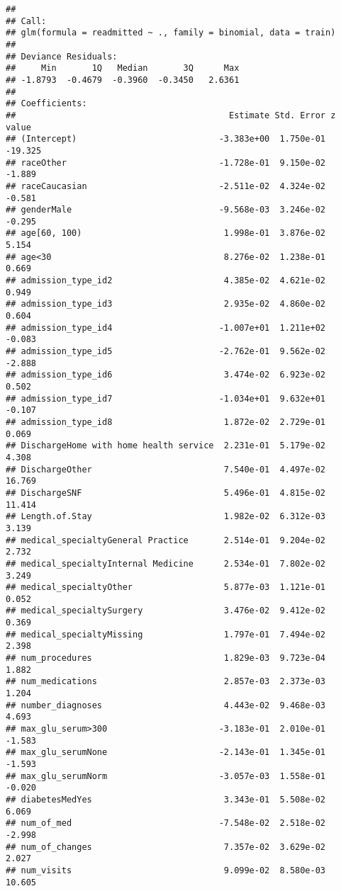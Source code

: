 \documentclass[
]{article}
\begin{document}
\begin{verbatim}
## 
## Call:
## glm(formula = readmitted ~ ., family = binomial, data = train)
## 
## Deviance Residuals: 
##     Min       1Q   Median       3Q      Max  
## -1.8793  -0.4679  -0.3960  -0.3450   2.6361  
## 
## Coefficients:
##                                          Estimate Std. Error z value
## (Intercept)                            -3.383e+00  1.750e-01 -19.325
## raceOther                              -1.728e-01  9.150e-02  -1.889
## raceCaucasian                          -2.511e-02  4.324e-02  -0.581
## genderMale                             -9.568e-03  3.246e-02  -0.295
## age[60, 100)                            1.998e-01  3.876e-02   5.154
## age<30                                  8.276e-02  1.238e-01   0.669
## admission_type_id2                      4.385e-02  4.621e-02   0.949
## admission_type_id3                      2.935e-02  4.860e-02   0.604
## admission_type_id4                     -1.007e+01  1.211e+02  -0.083
## admission_type_id5                     -2.762e-01  9.562e-02  -2.888
## admission_type_id6                      3.474e-02  6.923e-02   0.502
## admission_type_id7                     -1.034e+01  9.632e+01  -0.107
## admission_type_id8                      1.872e-02  2.729e-01   0.069
## DischargeHome with home health service  2.231e-01  5.179e-02   4.308
## DischargeOther                          7.540e-01  4.497e-02  16.769
## DischargeSNF                            5.496e-01  4.815e-02  11.414
## Length.of.Stay                          1.982e-02  6.312e-03   3.139
## medical_specialtyGeneral Practice       2.514e-01  9.204e-02   2.732
## medical_specialtyInternal Medicine      2.534e-01  7.802e-02   3.249
## medical_specialtyOther                  5.877e-03  1.121e-01   0.052
## medical_specialtySurgery                3.476e-02  9.412e-02   0.369
## medical_specialtyMissing                1.797e-01  7.494e-02   2.398
## num_procedures                          1.829e-03  9.723e-04   1.882
## num_medications                         2.857e-03  2.373e-03   1.204
## number_diagnoses                        4.443e-02  9.468e-03   4.693
## max_glu_serum>300                      -3.183e-01  2.010e-01  -1.583
## max_glu_serumNone                      -2.143e-01  1.345e-01  -1.593
## max_glu_serumNorm                      -3.057e-03  1.558e-01  -0.020
## diabetesMedYes                          3.343e-01  5.508e-02   6.069
## num_of_med                             -7.548e-02  2.518e-02  -2.998
## num_of_changes                          7.357e-02  3.629e-02   2.027
## num_visits                              9.099e-02  8.580e-03  10.605

\end{verbatim}
\end{document}
